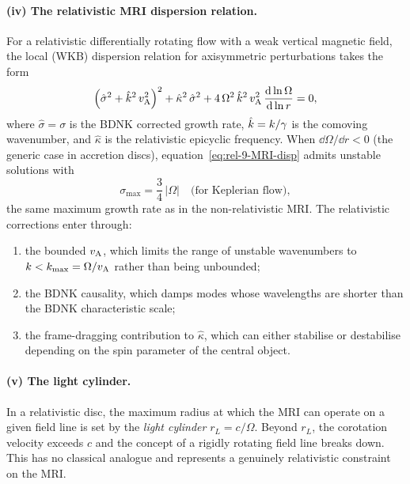 \paragraph{(iv) The relativistic MRI dispersion relation.}
For a relativistic differentially rotating flow with a weak vertical
magnetic field, the local (WKB) dispersion relation for axisymmetric
perturbations takes the form
\begin{equation}\label{eq:rel-9-MRI-disp}
  \Bigl(\hat{\sigma}^{2} + \hat{k}^{2}\,v_{\mathrm{A}}^{2}\Bigr)^{2}
  + \hat{\kappa}^{2}\,\hat{\sigma}^{2}
  + 4\,\Omega^{2}\,\hat{k}^{2}\,v_{\mathrm{A}}^{2}
  \,\frac{\mathrm{d}\ln\Omega}{\mathrm{d}\ln r} = 0,
\end{equation}
where $\hat{\sigma} = \sigma$ is the
BDNK corrected growth rate, $\hat{k} = k/\gamma$ is the
comoving wavenumber, and $\hat{\kappa}$ is the relativistic
epicyclic frequency.  When $\dd\Omega/\dd r < 0$ (the generic case
in accretion discs), equation~\eqref{eq:rel-9-MRI-disp} admits
unstable solutions with
\begin{equation}\label{eq:rel-9-MRI-maxgrowth}
  \sigma_{\max} = \frac{3}{4}\,\bigl|\Omega\bigr|
  \quad\text{(for Keplerian flow)},
\end{equation}
the same maximum growth rate as in the non-relativistic MRI.  The
relativistic corrections enter through:
\begin{enumerate}
  \item the bounded $v_{\mathrm{A}}$, which limits the range of unstable
        wavenumbers to
        $k < k_{\max} = \Omega/v_{\mathrm{A}}$ rather than being unbounded;
  \item the BDNK causality, which damps modes whose wavelengths are
        shorter than the BDNK characteristic scale;
  \item the frame-dragging contribution to $\hat{\kappa}$, which
        can either stabilise or destabilise depending on the spin
        parameter of the central object.
\end{enumerate}

\paragraph{(v) The light cylinder.}
In a relativistic disc, the maximum radius at which the MRI can
operate on a given field line is set by the \emph{light cylinder}
$r_{L} = c/\Omega$.  Beyond $r_{L}$, the corotation velocity exceeds
$c$ and the concept of a rigidly rotating field line breaks down.
This has no classical analogue and represents a genuinely relativistic
constraint on the MRI.


